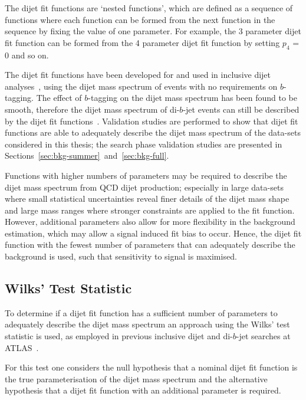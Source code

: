 The dijet fit functions are `nested functions',
which are defined as a sequence of functions where each function can be formed from the next function in the sequence by fixing the value of one parameter.
For example, the 3 parameter dijet fit function can be formed from the 4 parameter dijet fit function by setting $p_4$ = 0 and so on.

The dijet fit functions have been developed for and used in inclusive dijet analyses~\cite{theo-dijet_harris},
using the dijet mass spectrum of events with no requirements on $b$-tagging.
The effect of $b$-tagging on the dijet mass spectrum has been found to be smooth,
therefore the dijet mass spectrum of di-$b$-jet events can still be described by the dijet fit functions~\cite{dibjet-mori16_paper}.
Validation studies are performed to show that dijet fit functions are able
to adequately describe the dijet mass spectrum of the data-sets considered in this thesis;
the search phase validation studies are presented in Sections~\ref{sec:bkg-summer}~and~\ref{sec:bkg-full}.

Functions with higher numbers of parameters may be required to describe the dijet mass spectrum from QCD dijet production;
especially in large data-sets where small statistical uncertainties reveal finer details of the dijet mass shape
and large mass ranges where stronger constraints are applied to the fit function.
However, additional parameters also allow for more flexibility in the background estimation,
which may allow a signal induced fit bias to occur.
Hence, the dijet fit function with the fewest number of parameters
that can adequately describe the background is used, such that sensitivity to signal is maximised.

\subsection{Wilks' Test Statistic} 
\label{sec:bkg-wilks}

To determine if a dijet fit function has a sufficient number of parameters to adequately describe the dijet mass spectrum
an approach using the Wilks' test statistic is used,
as employed in previous inclusive dijet and di-$b$-jet searches at ATLAS~\cite{dijet-mori16_paper,dibjet-mori16_paper}.

For this test one considers the null hypothesis that a nominal dijet fit function is the true parameterisation of the dijet mass spectrum
and the alternative hypothesis that a dijet fit function with an additional parameter is required.

